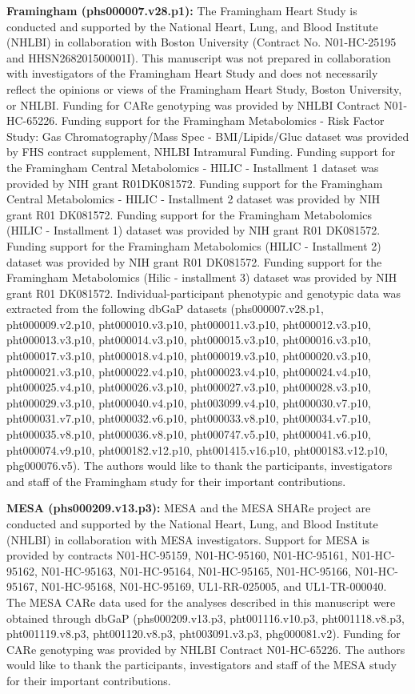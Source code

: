\documentclass[12pt]{article}
\begin{document}
\textbf{Framingham (phs000007.v28.p1):} The Framingham Heart Study is conducted and supported by the National Heart, Lung, and Blood Institute (NHLBI) in collaboration with Boston University (Contract No. N01-HC-25195 and HHSN268201500001I). This manuscript was not prepared in collaboration with investigators of the Framingham Heart Study and does not necessarily reflect the opinions or views of the Framingham Heart Study, Boston University, or NHLBI. Funding for CARe genotyping was provided by NHLBI Contract N01-HC-65226. Funding support for the Framingham Metabolomics - Risk Factor Study: Gas Chromatography/Mass Spec - BMI/Lipids/Gluc dataset was provided by FHS contract supplement, NHLBI Intramural Funding. Funding support for the Framingham Central Metabolomics - HILIC - Installment 1 dataset was provided by NIH grant R01DK081572. Funding support for the Framingham Central Metabolomics - HILIC - Installment 2 dataset was provided by NIH grant R01 DK081572. Funding support for the Framingham Metabolomics (HILIC - Installment 1) dataset was provided by NIH grant R01 DK081572. Funding support for the Framingham Metabolomics (HILIC - Installment 2) dataset was provided by NIH grant R01 DK081572. Funding support for the Framingham Metabolomics (Hilic - installment 3) dataset was provided by NIH grant R01 DK081572. Individual-participant phenotypic and genotypic data was extracted from the following dbGaP datasets (phs000007.v28.p1, pht000009.v2.p10, pht000010.v3.p10, pht000011.v3.p10, pht000012.v3.p10, pht000013.v3.p10, pht000014.v3.p10, pht000015.v3.p10, pht000016.v3.p10, pht000017.v3.p10, pht000018.v4.p10, pht000019.v3.p10, pht000020.v3.p10, pht000021.v3.p10, pht000022.v4.p10, pht000023.v4.p10, pht000024.v4.p10, pht000025.v4.p10, pht000026.v3.p10, pht000027.v3.p10, pht000028.v3.p10, pht000029.v3.p10, pht000040.v4.p10, pht003099.v4.p10, pht000030.v7.p10, pht000031.v7.p10, pht000032.v6.p10, pht000033.v8.p10, pht000034.v7.p10, pht000035.v8.p10, pht000036.v8.p10, pht000747.v5.p10, pht000041.v6.p10, pht000074.v9.p10, pht000182.v12.p10, pht001415.v16.p10, pht000183.v12.p10, phg000076.v5). The authors would like to thank the participants, investigators and staff of the Framingham study for their important contributions. 

\textbf{MESA (phs000209.v13.p3):} MESA and the MESA SHARe project are conducted and supported by the National Heart, Lung, and Blood Institute (NHLBI) in collaboration with MESA investigators. Support for MESA is provided by contracts N01-HC-95159, N01-HC-95160, N01-HC-95161, N01-HC-95162, N01-HC-95163, N01-HC-95164, N01-HC-95165, N01-HC-95166, N01-HC-95167, N01-HC-95168, N01-HC-95169, UL1-RR-025005, and UL1-TR-000040. The MESA CARe data used for the analyses described in this manuscript were obtained through dbGaP (phs000209.v13.p3, pht001116.v10.p3, pht001118.v8.p3, pht001119.v8.p3, pht001120.v8.p3, pht003091.v3.p3, phg000081.v2). Funding for CARe genotyping was provided by NHLBI Contract N01-HC-65226. The authors would like to thank the participants, investigators and staff of the MESA study for their important contributions.
\end{document}
